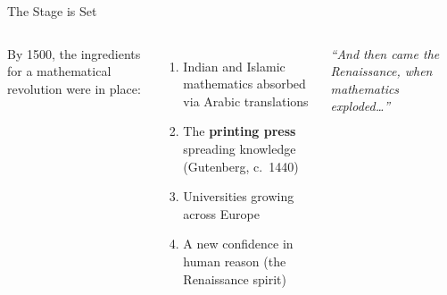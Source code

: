 \begin{frame}{The Stage is Set}
  \begin{columns}[T]
    {\small By 1500, the ingredients for a mathematical revolution were in place:}
    \vspace{0.4em}
    \begin{enumerate}\setlength\itemsep{4pt}
      \item[\textcolor{medievalPurple}{\textbf{1.}}] {\small Indian and Islamic mathematics absorbed via Arabic translations}
      \item[\textcolor{medievalPurple}{\textbf{2.}}] {\small The \textbf{printing press} spreading knowledge (Gutenberg, c.\ 1440)}
      \item[\textcolor{medievalPurple}{\textbf{3.}}] {\small Universities growing across Europe}
      \item[\textcolor{medievalPurple}{\textbf{4.}}] {\small A new confidence in human reason (the Renaissance spirit)}
    \end{enumerate}

    \vspace{0.5em}
    {\small\itshape ``And then came the Renaissance, when mathematics exploded\ldots''}

  \end{columns}

\end{frame}
